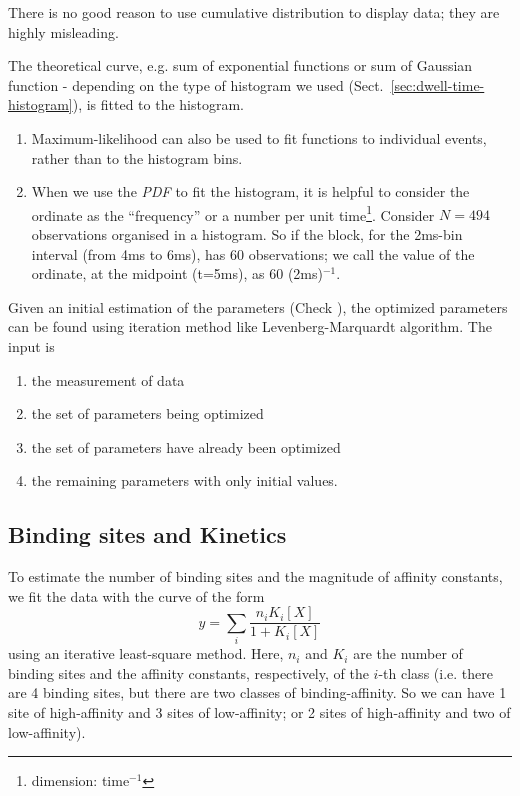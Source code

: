 \begin{framed}
  There is no good reason to use cumulative distribution to display
  data; they are highly misleading.
\end{framed}


The theoretical curve, e.g. sum of exponential functions or sum of
Gaussian function - depending on the type of histogram we used
(Sect.~\ref{sec:dwell-time-histogram}), is fitted to the histogram.
\begin{enumerate}
\item Maximum-likelihood can also be used to fit functions to
  individual events, rather than to the histogram bins.
\item When we use the {\it PDF} to fit the histogram, it is helpful to
  consider the ordinate as the ``frequency'' or a number per unit
  time\footnote{dimension: time$^{-1}$}. Consider $N=494$ observations
  organised in a histogram. So if the block, for the 2ms-bin interval
  (from 4ms to 6ms), has 60 observations; we call the value of the
  ordinate, at the midpoint (t=5ms), as 60 (2ms)$^{-1}$.
\end{enumerate}

Given an initial estimation of the parameters (Check \citep{sun2000mlc}), the
optimized parameters can be found using iteration method like
Levenberg-Marquardt algorithm. The input is
\begin{enumerate}
  \item the measurement of data
  \item the set of parameters being optimized
  \item the set of parameters have already been optimized
  \item the remaining parameters with only initial values.
\end{enumerate}

\subsection{Binding sites and Kinetics}

To estimate the number of binding sites and the magnitude of affinity constants,
we fit the data with the curve of the form
\begin{equation}
y = \sum_i \frac{n_i K_i[X]}{1 + K_i [X]}
\end{equation}
using an iterative least-square method. Here, $n_i$ and $K_i$ are the number of
binding sites and the affinity constants, respectively, of the $i$-th class
(i.e. there are 4 binding sites, but there are two classes of binding-affinity.
So we can have 1 site of high-affinity and 3 sites of low-affinity; or 2 sites
of high-affinity and two of low-affinity).

